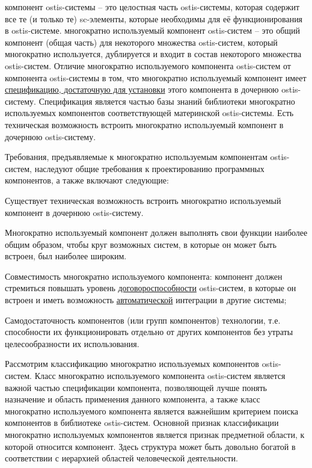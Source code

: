 \begin{SCn}
\end{SCn}

компонент ostis-системы -- это целостная часть ostis-системы, которая содержит все те (и только те) sc-элементы, которые необходимы для её функционирования в ostis-системе. многократно используемый компонент ostis-систем -- это общий компонент (общая часть) для некоторого множества ostis-систем, который многократно используется, дублируется и входит в состав некоторого множества ostis-систем.
Отличие многократно используемого компонента ostis-систем от компонента ostis-системы в том, что многократно используемый компонент имеет \underline{спецификацию, достаточную для установки} этого компонента в дочернюю ostis-систему. Спецификация является частью базы знаний библиотеки многократно используемых компонентов соответствующей материнской ostis-системы. Есть техническая возможность встроить многократно используемый компонент в дочернюю ostis-систему.

Требования, предъявляемые к многократно используемым компонентам ostis-систем, наследуют общие требования к проектированию программных компонентов, а также включают следующие:
\begin{textitemize}
	\item{Существует техническая возможность встроить многократно используемый компонент в дочернюю ostis-систему.}
	\item{Многократно используемый компонент должен выполнять свои функции наиболее общим образом, чтобы круг возможных систем, в которые он может быть встроен, был наиболее широким.}
	\item{Совместимость многократно используемого компонента: компонент должен стремиться повышать уровень \underline{договороспособности} ostis-систем, в которые он встроен и иметь возможность \underline{автоматической} интеграции в другие системы;}
	\item{Самодостаточность компонентов (или групп компонентов) технологии, т.е. способности их функционировать отдельно от других компонентов без утраты целесообразности их использования.}
\end{textitemize}

Рассмотрим классификацию многократно используемых компонентов ostis-систем. Класс многократно используемого компонента ostis-систем является важной частью спецификации компонента, позволяющей лучше понять назначение и область применения данного компонента, а также класс многократно используемого компонента является важнейшим критерием поиска компонентов в библиотеке ostis-систем. Основной признак классификации многократно используемых компонентов является признак предметной области, к которой относится компонент. Здесь структура может быть довольно богатой в соответствии с иерархией областей человеческой деятельности.

